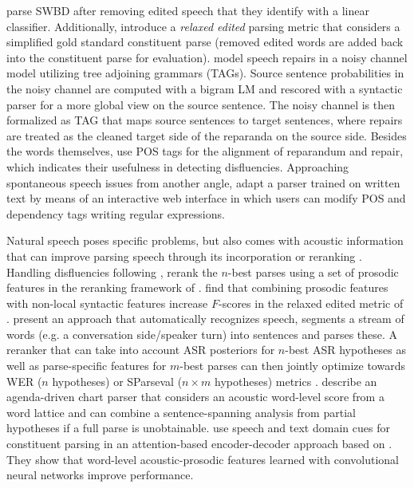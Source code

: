 \documentclass[11pt,letterpaper]{article}
\begin{document}
\citet{CharniakJohnson:2001} parse SWBD after removing edited speech that they identify with a linear classifier. Additionally, \citet{CharniakJohnson:2001} introduce a \emph{relaxed edited} parsing metric that considers a simplified gold standard constituent parse (removed edited words are added back into the constituent parse for evaluation). \citet{JohnsonCharniak:2004} model speech repairs in a noisy channel model utilizing tree adjoining grammars (TAGs). Source sentence probabilities in the noisy channel are computed with a bigram LM and rescored with a syntactic parser for a more global view on the source sentence. The noisy channel is then formalized as TAG that maps source sentences to target sentences, where repairs are treated as the cleaned target side of the reparanda on the source side. Besides the words themselves, \citet{JohnsonCharniak:2004} use POS tags for the alignment of reparandum and repair, which indicates their usefulness in detecting disfluencies. Approaching spontaneous speech issues from another angle, \mbox{\citet{BechetEtal:2014:is}} adapt a parser trained on written text by means of an interactive web interface \citep{BazillonEtal:2012} in which users can modify POS and dependency tags writing regular expressions.

Natural speech poses specific problems, but also comes with acoustic information that can improve parsing speech through its incorporation \citep{TranEtal:2017} or reranking \citep{KahnEtal:2005}. Handling disfluencies following \citet{CharniakJohnson:2001}, \citet{KahnEtal:2005} rerank the $n$-best parses using a set of prosodic features in the reranking framework of \citet{Collins:2000}. \citet{KahnEtal:2005} find that combining prosodic features with non-local syntactic features increase $F$-scores in the relaxed edited metric of \citet{CharniakJohnson:2001}. \citet{KahnOstendorf:2012} present an approach that automatically recognizes speech, segments a stream of words (e.g. a conversation side/speaker turn) into sentences and parses these. A reranker that can take into account ASR posteriors for $n$-best ASR hypotheses as well as parse-specific features for $m$-best parses can then jointly optimize towards WER ($n$ hypotheses) or SParseval \citep{RoarkEtal:2006} ($n \times m$ hypotheses) metrics \citep{KahnOstendorf:2012}.
\citet{EhrlichHanrieder:1996} describe an agenda-driven chart parser that considers an acoustic word-level score from a word lattice and can combine a sentence-spanning analysis from partial hypotheses if a full parse is unobtainable.  \citet{TranEtal:2017} use speech and text domain cues for constituent parsing in an attention-based encoder-decoder approach based on \citet{VinyalsEtal:2015}. They show that word-level acoustic-prosodic features learned with convolutional neural networks improve performance.
\end{document}
